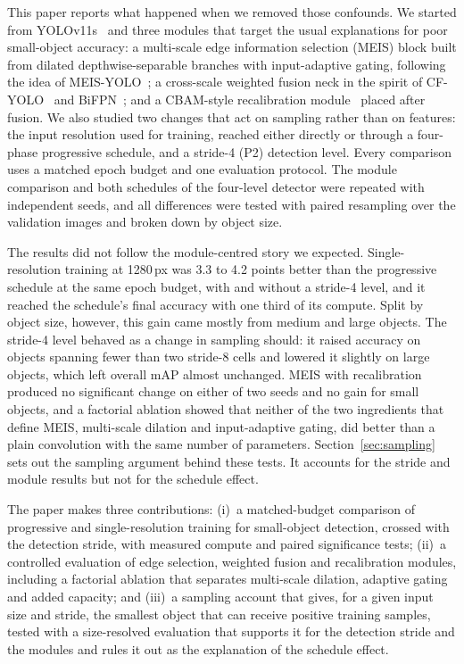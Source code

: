 \documentclass[preprint,12pt]{elsarticle}
\begin{document}
This paper reports what happened when we removed those confounds. We started from
YOLOv11s~\cite{yolov11} and three modules that target the usual explanations for
poor small-object accuracy: a multi-scale edge information selection (MEIS) block
built from dilated depthwise-separable branches with input-adaptive gating,
following the idea of MEIS-YOLO~\cite{meis-yolo}; a cross-scale weighted fusion
neck in the spirit of CF-YOLO~\cite{cf-yolo} and BiFPN~\cite{efficientdet}; and a
CBAM-style recalibration module~\cite{cbam} placed after fusion. We also studied
two changes that act on sampling rather than on features: the input resolution
used for training, reached either directly or through a four-phase progressive
schedule, and a stride-4 (P2) detection level. Every comparison uses a matched
epoch budget and one evaluation protocol. The module comparison and both schedules
of the four-level detector were repeated with independent seeds, and all differences
were tested with paired resampling over the validation images and broken down by
object size.

The results did not follow the module-centred story we expected. Single-resolution
training at 1280\,px was 3.3 to 4.2 points better than the progressive schedule at
the same epoch budget, with and without a stride-4 level, and it reached the
schedule's final accuracy with one third of its compute. Split by object size,
however, this gain came mostly from medium and large objects. The stride-4 level
behaved as a change in sampling should: it raised accuracy on objects spanning
fewer than two stride-8 cells and lowered it slightly on large objects, which left
overall mAP almost unchanged. MEIS with recalibration produced no significant
change on either of two seeds and no gain for small objects, and a factorial
ablation showed that neither of the two ingredients that define MEIS, multi-scale
dilation and input-adaptive gating, did better than a plain convolution with the
same number of parameters. Section~\ref{sec:sampling} sets out the sampling
argument behind these tests. It accounts for the stride and module results but not
for the schedule effect.

The paper makes three contributions: (i)~a matched-budget comparison of
progressive and single-resolution training for small-object detection, crossed
with the detection stride, with measured compute and paired significance tests;
(ii)~a controlled evaluation of edge selection, weighted fusion and recalibration
modules, including a factorial ablation that separates multi-scale dilation,
adaptive gating and added capacity; and (iii)~a sampling account that gives, for a
given input size and stride, the smallest object that can receive positive training
samples, tested with a size-resolved evaluation that supports it for the detection
stride and the modules and rules it out as the explanation of the schedule effect.
\end{document}
